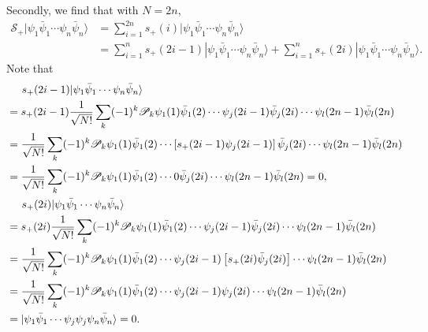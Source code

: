 \documentclass[a4paper]{book}
\newcounter{solution}[chapter]
\begin{document}
\begin{solution}
	Secondly, we find that with $N=2n$,
	\begin{align*}
		\mathscr{S}_+ | \psi_1 \bar{\psi}_1 \cdots \psi_n \bar{\psi}_n \rangle &= \sum_{ i=1 }^{ 2n } s_+(i) | \psi_1 \bar{\psi}_1 \cdots \psi_n \bar{\psi}_n \rangle \\
		&= \sum_{ i=1 }^{ n } s_+(2i-1) | \psi_1 \bar{\psi}_1 \cdots \psi_n \bar{\psi}_n \rangle + \sum_{ i=1 }^{ n } s_+(2i) | \psi_1 \bar{\psi}_1 \cdots \psi_n \bar{\psi}_n \rangle .
	\end{align*}
	Note that
	\begin{align*}
		&\hspace{1.4em}s_+(2i-1) | \psi_1 \bar{\psi}_1 \cdots \psi_n \bar{\psi}_n \rangle \\
		&= s_+(2i-1) \frac{1}{ \sqrt{N!} } \sum_{ k } (-1)^k \mathscr{P}_k \psi_1(1) \bar{\psi}_1(2) \cdots \psi_j( 2i-1 ) \bar{\psi}_{j}( 2i ) \cdots \psi_l( 2n - 1 ) \bar{\psi}_l (2n) \\
		&= \frac{1}{ \sqrt{N!} } \sum_{ k } (-1)^k \mathscr{P}_k \psi_1(1) \bar{\psi}_1(2) \cdots \left[ s_+(2i-1) \psi_j( 2i-1 ) \right] \bar{\psi}_{j}( 2i ) \cdots \psi_l( 2n - 1 ) \bar{\psi}_l (2n) \\
		&= \frac{1}{ \sqrt{N!} } \sum_{ k } (-1)^k \mathscr{P}_k \psi_1(1) \bar{\psi}_1(2) \cdots 0 \bar{\psi}_{j}( 2i ) \cdots \psi_l( 2n - 1 ) \bar{\psi}_l (2n) = 0, \\
		&\hspace{1.4em}s_+(2i) | \psi_1 \bar{\psi}_1 \cdots \psi_n \bar{\psi}_n \rangle \\
		&= s_+(2i) \frac{1}{ \sqrt{N!} } \sum_{ k } (-1)^k \mathscr{P}_k \psi_1(1) \bar{\psi}_1(2) \cdots \psi_j( 2i-1 ) \bar{\psi}_{j}( 2i ) \cdots \psi_l( 2n - 1 ) \bar{\psi}_l (2n) \\
		&= \frac{1}{ \sqrt{N!} } \sum_{ k } (-1)^k \mathscr{P}_k \psi_1(1) \bar{\psi}_1(2) \cdots \psi_j( 2i-1 ) \left[ s_+(2i) \bar{\psi}_{j}( 2i ) \right] \cdots \psi_l( 2n - 1 ) \bar{\psi}_l (2n) \\
		&= \frac{1}{ \sqrt{N!} } \sum_{ k } (-1)^k \mathscr{P}_k \psi_1(1) \bar{\psi}_1(2) \cdots \psi_j( 2i-1 ) \psi_{j}( 2i ) \cdots \psi_l( 2n - 1 ) \bar{\psi}_l (2n) \\
		&= | \psi_1 \bar{\psi}_1 \cdots \psi_j \psi_j \psi_n \bar{\psi}_n \rangle = 0 .
	\end{align*}		
	

\end{solution}
\end{document}
